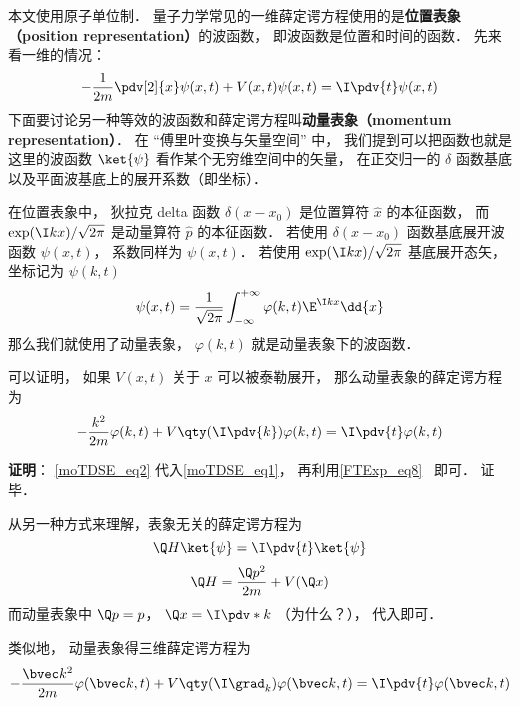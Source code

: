 
\begin{issues}
\issueDraft
\end{issues}


本文使用原子单位制． 量子力学常见的一维薛定谔方程使用的是\textbf{位置表象（position representation）}的波函数， 即波函数是位置和时间的函数． 先来看一维的情况：
\begin{equation}\label{moTDSE_eq1}
-\frac{1}{2m} \pdv[2]{x}\psi(x, t) + V(x,t)\psi(x,t) = \I \pdv{t} \psi(x,t)
\end{equation}
下面要讨论另一种等效的波函数和薛定谔方程叫\textbf{动量表象（momentum representation）}． 在 “傅里叶变换与矢量空间” 中， 我们提到可以把函数也就是这里的波函数 $\ket{\psi}$ 看作某个无穷维空间中的矢量， 在正交归一的 $\delta$ 函数基底以及平面波基底上的展开系数（即坐标）．

在位置表象中， 狄拉克 delta 函数 $\delta(x-x_0)$ 是位置算符 $\hat x$ 的本征函数， 而 $\exp(\I kx)/\sqrt{2\pi}$ 是动量算符 $\hat p$ 的本征函数． 若使用 $\delta(x-x_0)$ 函数基底展开波函数 $\psi(x, t)$， 系数同样为 $\psi(x, t)$． 若使用 $\exp(\I kx)/\sqrt{2\pi}$ 基底展开态矢， 坐标记为 $\psi(k, t)$
\begin{equation}\label{moTDSE_eq2}
\psi(x,t) = \frac{1}{\sqrt{2\pi}}\int_{-\infty}^{+\infty} \varphi(k,t)\E^{\I kx}\dd{x}
\end{equation}
那么我们就使用了动量表象， $\varphi(k, t)$ 就是动量表象下的波函数．


可以证明， 如果 $V(x,t)$ 关于 $x$ 可以被泰勒展开， 那么动量表象的薛定谔方程为
\begin{equation}
-\frac{k^2}{2m}\varphi(k, t) + V\qty(\I \pdv{k})\varphi(k, t) = \I \pdv{t} \varphi(k,t)
\end{equation}

\textbf{证明}： \autoref{moTDSE_eq2} 代入\autoref{moTDSE_eq1}， 再利用\autoref{FTExp_eq8}~ 即可． 证毕．

从另一种方式来理解，表象无关的薛定谔方程为
\begin{equation}
\Q H\ket{\psi} = \I \pdv{t}\ket{\psi}
\end{equation}
\begin{equation}
\Q H = \frac{\Q p^2}{2m} + V(\Q x)
\end{equation}
而动量表象中 $\Q p = p$， $\Q x  = \I \pdv*{k}$ （为什么？）， 代入即可．


类似地， 动量表象得三维薛定谔方程为
\begin{equation}
-\frac{\bvec k^2}{2m}\varphi(\bvec k, t) + V\qty(\I \grad_k)\varphi(\bvec k, t) = \I \pdv{t} \varphi(\bvec k,t)
\end{equation}
